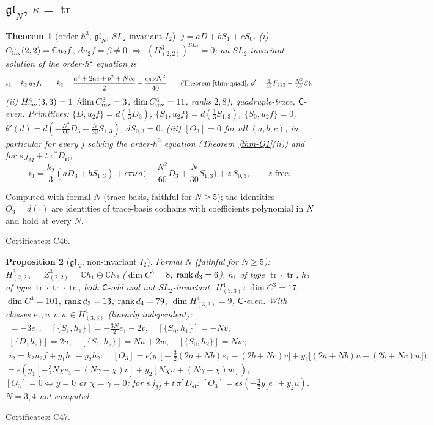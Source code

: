 \documentclass[10pt,a4paper]{article}
\numberwithin{equation}{section}
\newtheorem{theorem}{Theorem}[section]
\newtheorem{proposition}[theorem]{Proposition}
\theoremstyle{definition}
\theoremstyle{remark}
\newcommand{\tr}{\operatorname{tr}}
\newcommand{\fsl}{\mathfrak{sl}}
\newcommand{\fgl}{\mathfrak{gl}}
\newcommand{\cert}[1]{\par\noindent\textup{Certificates: #1.}\par}
\newcommand{\uf}{u_2f}
\newcommand{\Dthree}{D_3}
\begin{document}
\subsection{\texorpdfstring{$\fgl_N$, $\kappa=\tr$}{gl(N), kappa = tr}}

\begin{theorem}[order $\hbar^3$, $\fgl_N$, $SL_2$-invariant $I_2$]\label{thm-o3gl}
$j=aD+bS_1+cS_0$. (i) $C^3_{\rm inv}(2,2)=\mathbb C\uf$, $d\uf=\beta\neq0$ $\Rightarrow$ $(H^3_{(2,2)})^{SL_2}=0$; an $SL_2$-invariant solution of the order-$\hbar^2$ equation is
\begin{equation}
i_2=k_2\,\uf,\qquad k_2=\frac{a^2+2ac+b^2+Nbc}2-\frac{\epsilon\pi\nu N^2}{40}\qquad(\text{Theorem~\ref{thm-quad}, }o'=\tfrac1{48}F_{223}-\tfrac{N^2}{40}\beta).
\end{equation}
(ii) $H^4_{\rm inv}(3,3)=1$ ($\dim C^3_{\rm inv}=3$, $\dim C^4_{\rm inv}=11$, ranks $2,8$), quadruple-trace, $\mathsf C$-even. Primitives: $\{D,\uf\}=d(\frac13\Dthree)$, $\{S_1,\uf\}=d(\frac13S_{1,3})$, $\{S_0,\uf\}=0$, $\theta'(d)=d(-\frac{N^2}{60}\Dthree+\frac N{30}S_{1,3})$, $dS_{0,3}=0$.
(iii) $[O_3]=0$ for all $(a,b,c)$, in particular for every $j$ solving the order-$\hbar^2$ equation (Theorem~\ref{thm-Q1}(ii)) and for $s\,j_M+t\,\pi^*D_{\fsl}$;
\begin{equation}
i_3=\frac{k_2}3(a\Dthree+bS_{1,3})+\epsilon\pi\nu\,a\Big(-\frac{N^2}{60}\Dthree+\frac N{30}S_{1,3}\Big)+z\,S_{0,3},\qquad z\text{ free}.
\end{equation}
\end{theorem}
Computed with formal $N$ (trace basis, faithful for $N\ge5$); the identities $O_3=d(\cdot)$ are identities of trace-basis cochains with coefficients polynomial in $N$ and hold at every $N$.
\cert{C46}

\begin{proposition}[$\fgl_N$, non-invariant $I_2$]\label{prop-o3glgen}
Formal $N$ (faithful for $N\ge5$): $H^3_{(2,2)}=Z^3_{(2,2)}=\mathbb Ch_1\oplus\mathbb Ch_2$ ($\dim C^3=8$, ${\rm rank}\,d_3=6$), $h_1$ of type $\tr\cdot\tr$, $h_2$ of type $\tr\cdot\tr\cdot\tr$, both $\mathsf C$-odd and not $SL_2$-invariant. $H^4_{(3,3)}$: $\dim C^3=17$, $\dim C^4=101$, ${\rm rank}\,d_3=13$, ${\rm rank}\,d_4=79$, $\dim H^4_{(3,3)}=9$, $\mathsf C$-even. With classes $e_1,u,v,w\in H^4_{(3,3)}$ (linearly independent):
\begin{gather}
[\{D,h_1\}]=-3e_1,\quad[\{S_1,h_1\}]=-\tfrac{3N}2e_1-2v,\quad[\{S_0,h_1\}]=-Nv,\\ [\{D,h_2\}]=2u,\quad[\{S_1,h_2\}]=Nu+2w,\quad[\{S_0,h_2\}]=Nw;\\
i_2=k_2\uf+y_1h_1+y_2h_2:\quad [O_3]=\epsilon\Big(y_1\big[-\tfrac32(2a+Nb)e_1-(2b+Nc)v\big]+y_2\big[(2a+Nb)u+(2b+Nc)w\big]\Big),
\end{gather}
$=\epsilon(y_1[-\frac32N\chi e_1-(N\gamma-\chi)v]+y_2[N\chi u+(N\gamma-\chi)w])$; $[O_3]=0\iff y=0$ or $\chi=\gamma=0$; for $s\,j_M+t\,\pi^*D_{\fsl}$: $[O_3]=\epsilon s(-\frac32y_1e_1+y_2u)$. $N=3,4$ not computed.
\end{proposition}
\cert{C47}
\end{document}
